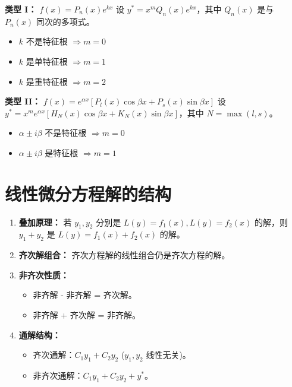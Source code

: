 \documentclass[a4paper,12pt]{ctexart}
\newenvironment{rednote}
  {\begin{tcolorbox}[colback=notepurple, colframe=highlightred, boxrule=1pt, title=\textbf{重点/技巧}]}
  {\end{tcolorbox}}
\begin{document}
\begin{rednote}
    \textbf{类型 I：} $f(x) = P_n(x) e^{kx}$
    设 $y^* = x^m Q_n(x) e^{kx}$，其中 $Q_n(x)$ 是与 $P_n(x)$ 同次的多项式。
    \begin{itemize}
        \item $k$ 不是特征根 $\Rightarrow m=0$
        \item $k$ 是单特征根 $\Rightarrow m=1$
        \item $k$ 是重特征根 $\Rightarrow m=2$
    \end{itemize}

    \textbf{类型 II：} $f(x) = e^{\alpha x} [P_l(x) \cos \beta x + P_s(x) \sin \beta x]$
    设 $y^* = x^m e^{\alpha x} [H_N(x) \cos \beta x + K_N(x) \sin \beta x]$，其中 $N = \max(l, s)$。
    \begin{itemize}
        \item $\alpha \pm i\beta$ 不是特征根 $\Rightarrow m=0$
        \item $\alpha \pm i\beta$ 是特征根 $\Rightarrow m=1$
    \end{itemize}
\end{rednote}

\section{线性微分方程解的结构}

\begin{enumerate}
    \item \textbf{叠加原理：} 若 $y_1, y_2$ 分别是 $L(y)=f_1(x), L(y)=f_2(x)$ 的解，则 $y_1+y_2$ 是 $L(y)=f_1(x)+f_2(x)$ 的解。
    \item \textbf{齐次解组合：} 齐次方程解的线性组合仍是齐次方程的解。
    \item \textbf{非齐次性质：}
    \begin{itemize}
        \item 非齐解 - 非齐解 = 齐次解。
        \item 非齐解 + 齐次解 = 非齐解。
    \end{itemize}
    \item \textbf{通解结构：}
    \begin{itemize}
        \item 齐次通解：$C_1 y_1 + C_2 y_2$ ($y_1, y_2$ 线性无关)。
        \item 非齐次通解：$C_1 y_1 + C_2 y_2 + y^*$。
    \end{itemize}
\end{enumerate}
\end{document}
